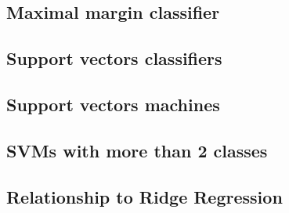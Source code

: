 \subsection{Maximal margin classifier}

\subsection{Support vectors classifiers}

\subsection{Support vectors machines}

\subsection{SVMs with more than 2 classes}

\subsection{Relationship to Ridge Regression}

%
%
